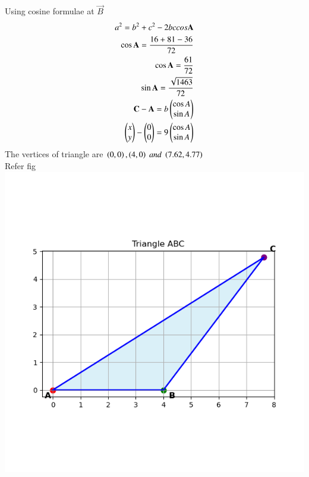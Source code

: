 \documentclass[journal]{IEEEtran}
\begin{document}
Using cosine formulae at $\vec{B}$ 
\begin{align}
a^2=b^2+c^2-2bccos\mathbf{A}\\
\cos{\mathbf{A}}=\frac{16+81-36}{72}\\
\cos{\mathbf{A}}=\frac{61}{72}\\
\sin{\mathbf{A}}=\frac{\sqrt{1463}}{72}\\
\mathbf{C}-\mathbf{A}=b\begin{pmatrix}\cos{A}\\ \sin{A}\end{pmatrix}\\
\begin{pmatrix}x\\y\end{pmatrix}-\begin{pmatrix}0\\0\end{pmatrix}=9\begin{pmatrix}\cos{A}\\ \sin{A}\end{pmatrix}\\
\end{align}
The vertices of triangle are $\left(0,0\right),\left(4,0\right)\; and\; \left(7.62,4.77\right) $\\
Refer fig
\centering
    \includegraphics[width=\columnwidth, height=0.8\textheight, keepaspectratio]{figs/Figure_5.png}     
\end{document}

